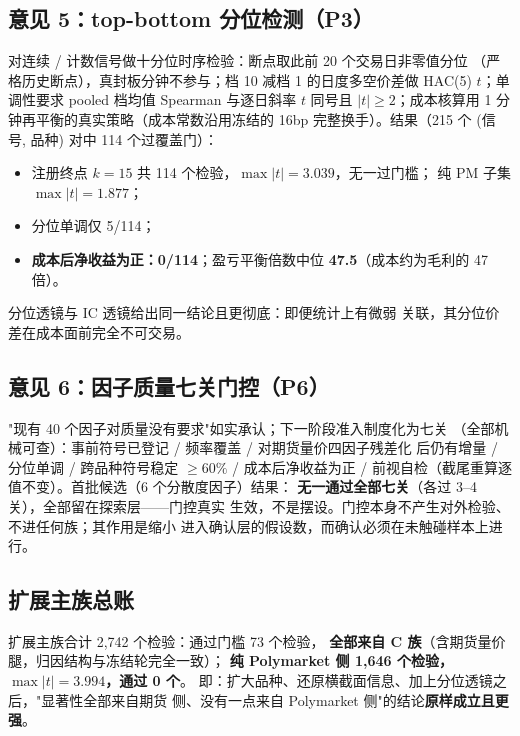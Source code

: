 \documentclass[11pt, a4paper]{ctexart}
\newcommand{\code}[1]{\texttt{\small #1}}
\begin{document}
\subsection{意见 5：top-bottom 分位检测（P3）}

对连续 / 计数信号做十分位时序检验：断点取此前 20 个交易日非零值分位
（严格历史断点），真封板分钟不参与；档 10 减档 1 的日度多空价差做
HAC(5) $t$；单调性要求 pooled 档均值 Spearman 与逐日斜率 $t$ 同号且
$|t|\ge2$；成本核算用 1 分钟再平衡的真实策略（成本常数沿用冻结的
16bp 完整换手）。结果（215 个 (信号, 品种) 对中 114 个过覆盖门）：

\begin{itemize}
\item 注册终点 $k{=}15$ 共 114 个检验，$\max|t|=3.039$，无一过门槛；
  纯 PM 子集 $\max|t|=1.877$；
\item 分位单调仅 5/114；
\item \textbf{成本后净收益为正：0/114}；盈亏平衡倍数中位
  \textbf{47.5}（成本约为毛利的 47 倍）。
\end{itemize}

\noindent 分位透镜与 IC 透镜给出同一结论且更彻底：即便统计上有微弱
关联，其分位价差在成本面前完全不可交易。

\subsection{意见 6：因子质量七关门控（P6）}

"现有 40 个因子对质量没有要求"如实承认；下一阶段准入制度化为七关
（全部机械可查）：事前符号已登记 / 频率覆盖 / 对期货量价四因子残差化
后仍有增量 / 分位单调 / 跨品种符号稳定 $\ge60\%$ / 成本后净收益为正 /
前视自检（截尾重算逐值不变）。首批候选（6 个分散度因子）结果：
\textbf{无一通过全部七关}（各过 3--4 关），全部留在探索层——门控真实
生效，不是摆设。门控本身不产生对外检验、不进任何族；其作用是缩小
进入确认层的假设数，而确认必须在未触碰样本上进行。

\subsection{扩展主族总账}

\begin{table}[h!]\centering\small
\caption{扩展主族的检验总账（数字由 \code{v4\_key\_numbers.py} 计算）。
门槛从 4.146 升至 \textbf{4.285}：扩展使判定更严而非更松，这本身就是
反操纵证明}\label{tab:ext}

\end{table}

\noindent 扩展主族合计 2{,}742 个检验：通过门槛 73 个检验，
\textbf{全部来自 C 族}（含期货量价腿，归因结构与冻结轮完全一致）；
\textbf{纯 Polymarket 侧 1{,}646 个检验，$\max|t|=3.994$，通过 0 个}。
即：扩大品种、还原横截面信息、加上分位透镜之后，"显著性全部来自期货
侧、没有一点来自 Polymarket 侧"的结论\textbf{原样成立且更强}。
\end{document}
